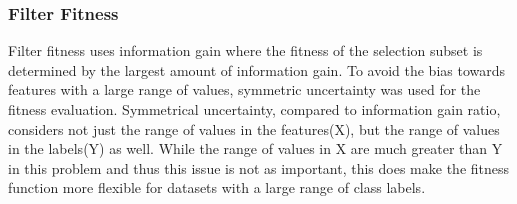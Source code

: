 \documentclass{article}
\begin{document}
\subsubsection*{Filter Fitness}
Filter fitness uses information gain where the fitness of the selection subset is determined by the largest amount of information gain. To avoid the bias towards features with a large range of values, symmetric uncertainty was used for the fitness evaluation. Symmetrical uncertainty, compared to information gain ratio, considers not just the range of values in the features(X), but the range of values in the labels(Y) as well. While the range of values in X are much greater than Y in this problem and thus this issue is not as important, this does make the fitness function more flexible for datasets with a large range of class labels. \par
\end{document}
